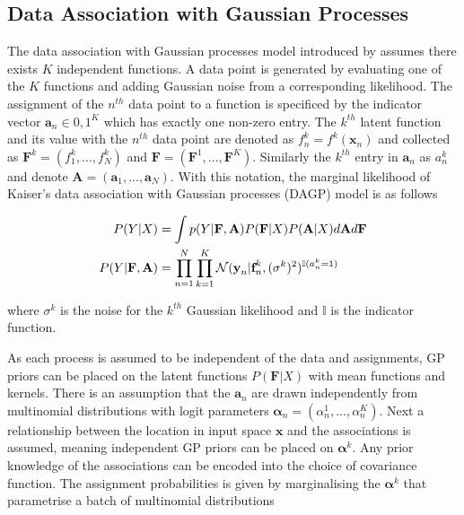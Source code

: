 \documentclass[12pt,a4paper]{report}
\theoremstyle{definition}
\begin{document}
\subsection{Data Association with Gaussian Processes}

The data association with Gaussian processes model introduced by \citet{Kaiser2018} assumes there exists $K$ independent functions.
A data point is generated by evaluating one of the $K$ functions and adding Gaussian noise from a corresponding likelihood.
The assignment of the $n^{th}$ data point to a function is specificed by the indicator vector $\textbf{a}_{n} \in {0, 1}^K$ which has exactly one non-zero entry.
The $k^{th}$ latent function and its value with the $n^{th}$ data point are denoted as $f_{n}^k = f^k(\textbf{x}_{n})$ and collected as $\textbf{F}^k = (f_{1}^k, ... , f_{N}^k)$ and $\textbf{F} = (\textbf{F}^1, ... , \textbf{F}^K)$.
Similarly the $k^{th}$ entry in $\textbf{a}_{n}$ as $a_{n}^k$ and denote $\textbf{A} = (\textbf{a}_{1}, ... , \textbf{a}_{N})$.
With this notation, the marginal likelihood of Kaiser's data association with Gaussian processes (DAGP) model is as follows

\begin{equation}
	\begin{aligned}
		\centering 
		P(Y | X) &= \int p(Y | \textbf{F}, \textbf{A}) P(\textbf{F} | X) P(\textbf{A} | X) d\textbf{A}d\textbf{F} \\
		P(Y | \textbf{F}, \textbf{A}) &= \prod_{n=1}^{N} \prod_{k=1}^{K} \mathcal{N}(\textbf{y}_{n} | \textbf{f}_{n}^k, (\sigma^k)^2)^{\mathbb{I}(a_{n}^k = 1)}
	\end{aligned}
\end{equation}

where $\sigma^k$ is the noise for the $k^{th}$ Gaussian likelihood and $\mathbb{I}$ is the indicator function.

As each process is assumed to be independent of the data and assignments, GP priors can be placed on the latent functions $P(\textbf{F} | X)$ with mean functions and kernels.
There is an assumption that the $\textbf{a}_{n}$ are drawn independently from multinomial distributions with logit parameters $\boldsymbol{\alpha}_{n} = (\alpha_{n}^1, ... , \alpha_{n}^K)$. 
Next a relationship between the location in input space $\textbf{x}$ and the associations is assumed, meaning independent GP priors can be placed on $\boldsymbol{\alpha}^k$.
Any prior knowledge of the associations can be encoded into the choice of covariance function.
The assignment probabilities is given by marginalising the $\boldsymbol{\alpha}^k$ that parametrise a batch of multinomial distributions
\end{document}
